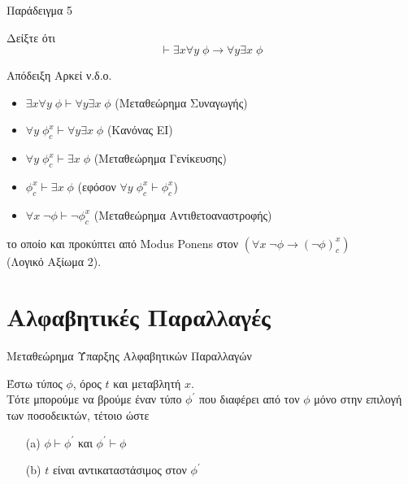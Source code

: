 \documentclass{beamer}
\begin{document}
\begin{frame}{Παράδειγμα 5}
  \begin{block}{}
    Δείξτε ότι
    \[
      \vdash \exists x \forall y \; \phi \rightarrow \forall y \exists x \; \phi
    \]
  \end{block}
  \begin{block}{Απόδειξη}
    Αρκεί ν.δ.ο.
    \begin{itemize}
      \item $\exists x \forall y \; \phi \vdash \forall y \exists x \; \phi$ (Μεταθεώρημα Συναγωγής)
      \item $\forall y \; \phi_c^x \vdash \forall y \exists x \; \phi$ (Κανόνας EI)
      \item $\forall y \; \phi_c^x \vdash \exists x \; \phi$ (Μεταθεώρημα Γενίκευσης)
      \item $\phi_c^x \vdash \exists x \; \phi$ (εφόσον $\forall y \; \phi_c^x \vdash \phi_c^x$)
      \item $\forall x \; \neg\phi \vdash \neg\phi_c^x$ (Μεταθεώρημα Αντιθετοαναστροφής)
    \end{itemize}
    το οποίο και προκύπτει από Modus Ponens στον $(\forall x \; \neg\phi \rightarrow (\neg\phi)_c^x)$\\
    (Λογικό Αξίωμα 2).
  \end{block}
\end{frame}

\section{Αλφαβητικές Παραλλαγές}

\begin{frame}{Μεταθεώρημα Ύπαρξης Αλφαβητικών Παραλλαγών}
  \begin{block}{}
    Έστω τύπος $\phi$, όρος $t$ και μεταβλητή $x$.\\
    Τότε μπορούμε να βρούμε έναν τύπο $\phi^\prime$ που διαφέρει από τον $\phi$ μόνο στην επιλογή των ποσοδεικτών, τέτοιο ώστε
    \begin{itemize}
      \item[(a)] $\phi \vdash \phi^\prime$ και $\phi^\prime \vdash \phi$
      \item[(b)] $t$ είναι αντικαταστάσιμος στον $\phi^\prime$
    \end{itemize}
  \end{block}
\end{frame}
\end{document}
